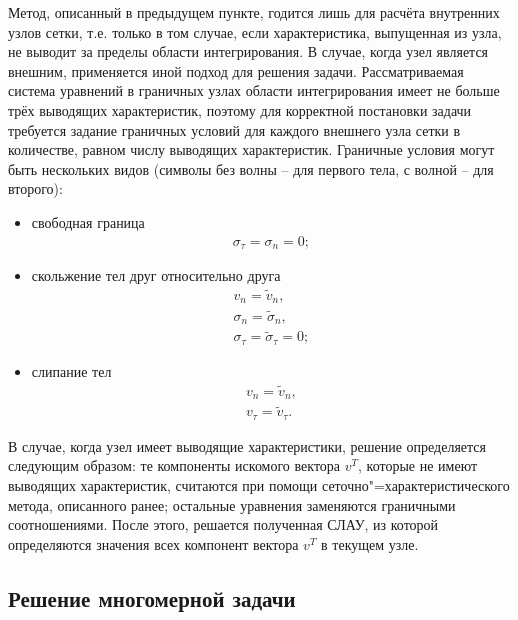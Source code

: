 Метод, описанный в предыдущем пункте, годится лишь для расчёта внутренних узлов
сетки, т.е. только в том случае, если характеристика, выпущенная из узла, не
выводит за пределы области интегрирования. В случае, когда узел является
внешним, применяется иной подход для решения задачи. Рассматриваемая система
уравнений в граничных узлах области интегрирования имеет не больше трёх
\cite{chelnokov} выводящих характеристик, поэтому для корректной постановки
задачи требуется задание граничных условий для каждого внешнего узла сетки в
количестве, равном числу выводящих характеристик. Граничные условия могут быть
нескольких видов (символы без волны -- для первого тела, с волной -- для второго):
\begin{itemize}
\item{свободная граница
\begin{eqnarray}
\sigma_\tau=\sigma_n=0; \nonumber
\end{eqnarray}}
\item{скольжение тел друг относительно друга 
\begin{eqnarray}
v_n=\tilde{v}_n,\nonumber\\
\sigma_n=\tilde{\sigma}_n,\nonumber\\
\sigma_\tau=\tilde{\sigma}_\tau=0; \nonumber
\end{eqnarray}}
\item{слипание тел
\begin{eqnarray}
v_n=\tilde{v}_n,\nonumber\\
v_\tau=\tilde{v}_\tau.
\end{eqnarray}}
\end{itemize}
В случае, когда узел имеет выводящие характеристики, решение определяется
следующим образом: те компоненты искомого вектора $v^T$, которые не имеют
выводящих характеристик, считаются при помощи сеточно"=характеристического
метода, описанного ранее; остальные уравнения заменяются граничными
соотношениями. После этого, решается полученная СЛАУ, из которой определяются
значения всех компонент вектора $v^T$ в текущем узле.


\subsection{Решение многомерной задачи}

